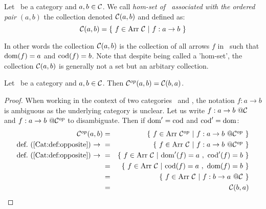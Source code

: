 \begin{defin}\label{Cat:def:homset}
    Let \Cat\ be a category and $a,b\in\mbox{$\cal C$}$. We call {\em hom-set of \Cat\ 
    associated with the ordered pair $(a,b)$} the collection denoted $\mbox{$\cal C$}(a,b)$ 
    and defined as:
        \[
            \Cat(a,b) = \{\ f\in\arr\ \Cat\ |\ f : a \to b\ \}
        \]
\end{defin}

\noindent
In other words the collection $\mbox{$\cal C$}(a,b)$ is the collection of all arrows $f$ in
\Cat\ such that $\mbox{\rm dom}(f)=a$ and $\mbox{\rm cod}(f)=b$. Note that despite being called a
'hom-set', the collection $\mbox{$\cal C$}(a,b)$ is generally not a set but an 
arbitary collection.

\begin{prop}\label{Cat:prop:homset:opposite}
    Let \Cat\ be a category and $a,b\in\mbox{$\cal C$}$. Then $\mbox{${\cal C}^{op}$}(a,b)=\mbox{$\cal C$}(b,a)$.
\end{prop}
\begin{proof}
    When working in the context of two categories \Cat\ and \Cop, the notation
    $f:a\to b$ is ambiguous as the underlying category is unclear. Let us
    write $f:a\to b\ @\mbox{$\cal C$}$ and $f:a\to b\ @\mbox{${\cal C}^{op}$}$ to disambiguate.
    Then if $\mbox{\rm dom}'=\mbox{\rm cod}$ and $\mbox{\rm cod}'=\mbox{\rm dom}$:
        \begin{eqnarray*}\Cop(a,b)
            &=&\{\ f\in\arr\ \Cop\ |\ f : a \to b\ @\Cop\ \}\\
            \mbox{def.~(\ref{Cat:def:opposite})\ $\to$\ }
            &=&\{\ f\in\arr\ \Cat\ |\ f : a \to b\ @\Cop\ \}\\
            \mbox{def.~(\ref{Cat:def:opposite})\ $\to$\ }
            &=&\{\ f\in\arr\ \Cat\ |\ \dom'(f)=a\ ,\ \cod'(f)=b\ \}\\
            &=&\{\ f\in\arr\ \Cat\ |\ \cod(f)=a\ ,\ \dom(f)=b\ \}\\
            &=&\{\ f\in\arr\ \Cat\ |\ f : b \to a\ @\Cat\ \}\\
            &=&\Cat(b,a)
        \end{eqnarray*}
\end{proof}

